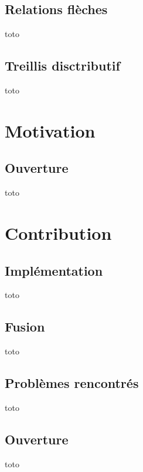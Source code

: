 \documentclass{beamer}
\begin{document}
\subsection{Relations flèches}

\begin{frame}
	toto
\end{frame}
\subsection{Treillis disctributif}
\begin{frame}
	toto
\end{frame}

\section{Motivation}
\subsection{Ouverture}
\begin{frame}
	toto
\end{frame}

\section{Contribution}
\subsection{Implémentation}
\begin{frame}
	toto
\end{frame}
\subsection{Fusion}
\begin{frame}
	toto
\end{frame}
\subsection{Problèmes rencontrés}
\begin{frame}
	toto
\end{frame}
\subsection{Ouverture}
\begin{frame}
	toto
\end{frame}
\end{document}
